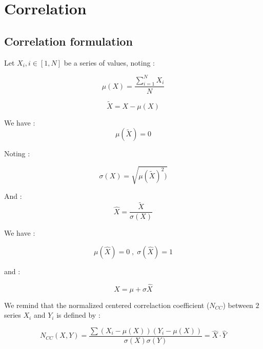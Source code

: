 
\section{Correlation}

\subsection{Correlation formulation}


Let $X_i, i \in [1,N] $ be a series of values, noting :

\begin{equation}
     \mu(X) = \frac{\sum_{i=1}^N  X_i}{N}
\end{equation}

\begin{equation}
     \widetilde{X} = X - \mu(X)
\end{equation}

We have : 
\begin{equation}
     \mu(\widetilde{X}) = 0
\end{equation}

Noting :

\begin{equation}
     \sigma(X) =   \sqrt{\mu(\widetilde{X})^2)   }
\end{equation}

And  :
\begin{equation}
     \widehat {X} =   \frac{\widetilde{X}}{\sigma(X)}
\end{equation}

We have :

\begin{equation}
     \mu(\widehat {X}) =0    \; , \; \sigma(\widehat {X}) = 1  
    \label{CorrelSig1Avg0}
\end{equation}

and :

\begin{equation}
     X = \mu + \sigma \widehat {X}
    \label{CorrelXXHat}
\end{equation}



We remind that the normalized centered correlaction coefficient ($N_{CC}$)  between $2$ series $X_i$ and $Y_i$ is defined by :

\begin{equation}
    N_{CC}(X,Y) = \frac{\sum (X_i-\mu(X)) (Y_i-\mu(X)) }{\sigma(X)\sigma(Y)}   = \widehat {X} \cdot \widehat {Y}
\end{equation}


